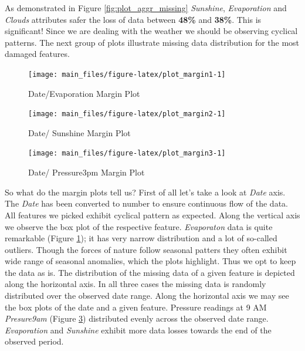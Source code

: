 As demonstrated in Figure \ref{fig:plot_aggr_missing} \emph{Sunshine},
\emph{Evaporation} and \emph{Clouds} attributes safer the loss of data
between \textbf{48\%} and \textbf{38\%}. This is significant! Since we
are dealing with the weather we should be observing cyclical patterns.
The next group of plots illustrate missing data distribution for the
most damaged features.

\begin{Schunk}
\begin{figure}[H]

{\centering \texttt{[image: main\_files/figure-latex/plot\_margin1-1]} 

}

\caption[Date/Evaporation Margin Plot]{Date/Evaporation Margin Plot}\label{fig:plot_margin1}
\end{figure}
\end{Schunk}

\begin{Schunk}
\begin{figure}[H]

{\centering \texttt{[image: main\_files/figure-latex/plot\_margin2-1]} 

}

\caption[Date/ Sunshine Margin Plot]{Date/ Sunshine Margin Plot}\label{fig:plot_margin2}
\end{figure}
\end{Schunk}

\begin{Schunk}
\begin{figure}[H]

{\centering \texttt{[image: main\_files/figure-latex/plot\_margin3-1]} 

}

\caption[Date/ Pressure3pm Margin Plot]{Date/ Pressure3pm Margin Plot}\label{fig:plot_margin3}
\end{figure}
\end{Schunk}

So what do the margin plots tell us? First of all let's take a look at
\emph{Date} axis. The \emph{Date} has been converted to number to ensure
continuous flow of the data. All features we picked exhibit cyclical
pattern as expected. Along the vertical axis we observe the box plot of
the respective feature. \emph{Evaporaton} data is quite remarkable
(Figure \ref{fig:plot_margin1}); it has very narrow distribution and a
lot of so-called outliers. Though the forces of nature follow seasonal
patters they often exhibit wide range of seasonal anomalies, which the
plots highlight. Thus we opt to keep the data as is. The distribution of
the missing data of a given feature is depicted along the horizontal
axis. In all three cases the missing data is randomly distributed over
the observed date range. Along the horizontal axis we may see the box
plots of the date and a given feature. Pressure readings at 9 AM
\emph{Presure9am} (Figure \ref{fig:plot_margin3}) distributed evenly
across the observed date range. \emph{Evaporation} and \emph{Sunshine}
exhibit more data losses towards the end of the observed period.

